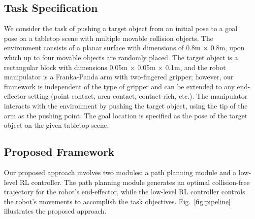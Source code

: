 \subsection{Task Specification}
\label{sec:task-specification}

We consider the task of pushing a target object from an initial pose to a goal pose on a tabletop scene with multiple movable collision objects. The environment consists of a planar surface with dimensions of 0.8m $\times$ 0.8m, upon which up to four movable objects are randomly placed. The target object is a rectangular block with dimensions 0.05m $\times$ 0.05m $\times$ 0.1m, and the robot manipulator is a Franka-Panda arm with two-fingered gripper; however, our framework is independent of the type of gripper and can be extended to any end-effector setting (point contact, area contact, contact-rich, etc.). The manipulator interacts with the environment by pushing the target object, using the tip of the arm as the pushing point. The goal location is specified as the pose of the target object on the given tabletop scene. 

\subsection{Proposed Framework}

Our proposed approach involves two modules: a path planning module and a low-level RL controller. The path planning module generates an optimal collision-free trajectory for the robot's end-effector, while the low-level RL controller controls the robot's movements to accomplish the task objectives. Fig.~\ref{fig:pipeline} illustrates the proposed approach.

